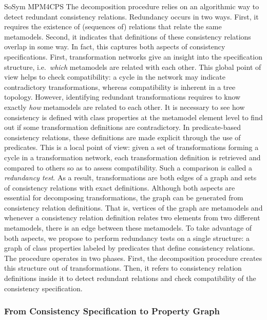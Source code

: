 \begin{copiedFrom}{SoSym MPM4CPS}
The decomposition procedure relies on an algorithmic way to detect redundant consistency relations. Redundancy occurs in two ways. First, it requires the existence of (sequences of) relations that relate the same metamodels. Second, it indicates that definitions of these consistency relations overlap in some way. In fact, this captures both aspects of consistency specifications. First, transformation networks give an insight into the specification structure, i.e.\ \textit{which} metamodels are related with each other. This global point of view helps to check compatibility: a cycle in the network may indicate contradictory transformations, whereas compatibility is inherent in a tree topology.
However, identifying redundant transformations requires to know exactly \textit{how} metamodels are related to each other. It is necessary to see how consistency is defined with class properties at the metamodel element level to find out if some transformation definitions are contradictory. In predicate-based consistency relations, these definitions are made explicit through the use of predicates. This is a local point of view: given a set of transformations forming a cycle in a transformation network, each transformation definition is retrieved and compared to others so as to assess compatibility. Such a comparison is called a \textit{redundancy test}.
As a result, transformations are both edges of a graph and sets of consistency relations with exact definitions. Although both aspects are essential for decomposing transformations, the graph can be generated from consistency relation definitions. That is, vertices of the graph are metamodels and whenever a consistency relation definition relates two elements from two different metamodels, there is an edge between these metamodels. To take advantage of both aspects, we propose to perform redundancy tests on a single structure: a graph of class properties labeled by predicates that define consistency relations. The procedure operates in two phases. First, the decomposition procedure creates this structure out of \qvtr transformations. Then, it refers to consistency relation definitions inside it to detect redundant relations and check compatibility of the consistency specification. 

\subsubsection{From Consistency Specification to Property Graph}


\end{copiedFrom}
